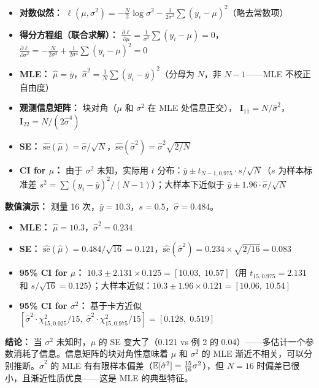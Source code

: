 \begin{itemize}
    \item \textbf{对数似然：} $\ell(\mu,\sigma^2) = -\frac{N}{2}\log\sigma^2 - \frac{1}{2\sigma^2}\sum(y_i - \mu)^2$（略去常数项）
    \item \textbf{得分方程组（联合求解）：}
    $\frac{\partial\ell}{\partial\mu} = \frac{1}{\sigma^2}\sum(y_i - \mu) = 0$，
    $\frac{\partial\ell}{\partial\sigma^2} = -\frac{N}{2\sigma^2} + \frac{1}{2\sigma^4}\sum(y_i - \mu)^2 = 0$
    \item \textbf{MLE：} $\hat{\mu} = \bar{y}$，$\hat{\sigma}^2 = \frac{1}{N}\sum(y_i - \bar{y})^2$（分母为 $N$，非 $N-1$——MLE 不校正自由度）
    \item \textbf{观测信息矩阵：} 块对角（$\mu$ 和 $\sigma^2$ 在 MLE 处信息正交），
    $\mathbf{I}_{11} = N/\hat{\sigma}^2$，$\mathbf{I}_{22} = N/(2\hat{\sigma}^4)$
    \item \textbf{SE：} $\widehat{\mathrm{se}}(\hat{\mu}) = \hat{\sigma}/\sqrt{N}$，$\widehat{\mathrm{se}}(\hat{\sigma}^2) = \hat{\sigma}^2\sqrt{2/N}$
    \item \textbf{CI for $\mu$：} 由于 $\sigma^2$ 未知，实际用 $t$ 分布：$\bar{y} \pm t_{N-1, 0.975}\cdot s/\sqrt{N}$（$s$ 为样本标准差 $s^2 = \sum(y_i-\bar{y})^2/(N-1)$）；大样本下近似于 $\bar{y} \pm 1.96\cdot\hat{\sigma}/\sqrt{N}$
\end{itemize}

\textbf{数值演示：} 测量 16 次，$\bar{y}=10.3$，$s=0.5$，$\hat{\sigma}=0.484$。

\begin{itemize}
    \item \textbf{MLE：} $\hat{\mu}=10.3$，$\hat{\sigma}^2=0.234$
    \item \textbf{SE：} $\widehat{\mathrm{se}}(\hat{\mu}) = 0.484/\sqrt{16}=0.121$，$\widehat{\mathrm{se}}(\hat{\sigma}^2)=0.234\times\sqrt{2/16}=0.083$
    \item \textbf{95\% CI for $\mu$：} $10.3 \pm 2.131\times 0.125 = [10.03,\; 10.57]$（用 $t_{15,0.975}=2.131$ 和 $s/\sqrt{16}=0.125$）；大样本近似：$10.3 \pm 1.96\times 0.121 = [10.06,\; 10.54]$
    \item \textbf{95\% CI for $\sigma^2$：} 基于卡方近似 $[\hat{\sigma}^2\cdot\chi^2_{15,0.025}/15,\; \hat{\sigma}^2\cdot\chi^2_{15,0.975}/15] = [0.128,\; 0.519]$
\end{itemize}

\textbf{结论：} 当 $\sigma^2$ 未知时，$\mu$ 的 SE 变大了（0.121 vs 例 2 的 0.04）——多估计一个参数消耗了信息。信息矩阵的块对角性意味着 $\mu$ 和 $\sigma^2$ 的 MLE 渐近不相关，可以分别推断。$\hat{\sigma}^2$ 的 MLE 有有限样本偏差（$\mathbb{E}[\hat{\sigma}^2] = \frac{15}{16}\sigma^2$），但 $N=16$ 时偏差已很小，且渐近性质优良——这是 MLE 的典型特征。

